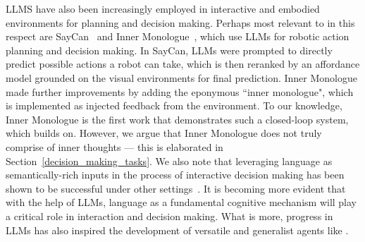 LLMS have also been increasingly employed in interactive and embodied environments for planning and decision making. Perhaps most relevant to \model{} in this respect are SayCan~\citep{ahn2022do} and Inner Monologue~\citep{huang2022inner}, which use LLMs for robotic action planning and decision making. In SayCan, LLMs were prompted to directly predict possible actions a robot can take, which is then reranked by an affordance model grounded on the visual environments for final prediction. Inner Monologue made further improvements by adding the eponymous ``inner monologue", which is implemented as injected feedback from the environment. To our knowledge, Inner Monologue is the first work that demonstrates such a closed-loop system, which \model{} builds on. However, we argue that Inner Monologue does not truly comprise of inner thoughts --- this is elaborated in Section~\ref{decision_making_tasks}.
We also note that leveraging language as semantically-rich inputs in the process of interactive decision making has been shown to be successful under other settings~\citep{abramson2020imitating,siddaharth2021lila,huang2022language,li2022pretrained}. It is becoming more evident that with the help of LLMs, language as a fundamental cognitive mechanism will play a critical role in interaction and decision making. What is more, progress in LLMs has also inspired the development of versatile and generalist agents like \cite{reed2022gato}.




